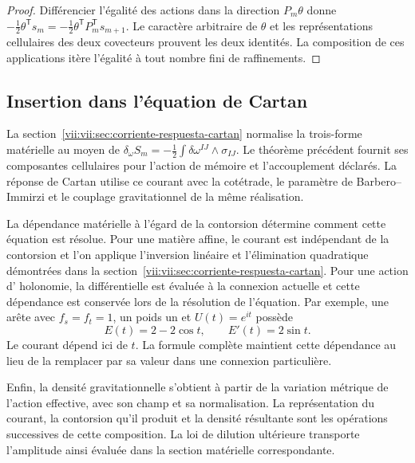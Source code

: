 \begin{proof}
Différencier l'égalité des actions dans la direction
\(P_m\theta\) donne
\(-\tfrac12\theta^{\mathsf T}s_m
 =-\tfrac12\theta^{\mathsf T}P_m^{\mathsf T}s_{m+1}\).
Le caractère arbitraire de \(\theta\) et les représentations cellulaires
des deux covecteurs prouvent les deux identités. La composition de
ces applications itère l'égalité à tout nombre fini de raffinements.
\end{proof}

\subsection{Insertion dans l'équation de Cartan}

La section~\ref{vii:vii:sec:corriente-respuesta-cartan} normalise la trois-forme matérielle au moyen de \(\delta_\omega S_m=-\tfrac12\int\delta\omega^{IJ}\wedge
\sigma_{IJ}\). Le théorème précédent fournit ses composantes cellulaires pour l'action de mémoire et l'accouplement déclarés. La réponse de Cartan utilise ce courant avec la cotétrade, le paramètre de Barbero--Immirzi et le couplage gravitationnel de la même réalisation.

La dépendance matérielle à l'égard de la contorsion détermine comment
cette équation est résolue. Pour une matière affine, le courant est indépendant
de la contorsion et l'on applique l'inversion linéaire et l'élimination
quadratique démontrées dans la section~\ref{vii:vii:sec:corriente-respuesta-cartan}.
Pour une action d'
holonomie, la différentielle est évaluée à la connexion actuelle et cette dépendance
est conservée lors de la résolution de l'équation. Par exemple, une arête avec
\(f_s=f_t=1\), un poids un et \(U(t)=e^{it}\) possède
\[
 E(t)=2-2\cos t,\qquad E'(t)=2\sin t.
\]
Le courant dépend ici de \(t\). La formule complète maintient
cette dépendance au lieu de la remplacer par sa valeur dans une connexion
particulière.

Enfin, la densité gravitationnelle s'obtient à partir de la variation
métrique de l'action effective, avec son champ et sa normalisation.
La représentation du courant, la contorsion qu'il produit et la
densité résultante sont les opérations successives de cette composition.
La loi de dilution ultérieure transporte l'amplitude ainsi évaluée dans
la section matérielle correspondante.
